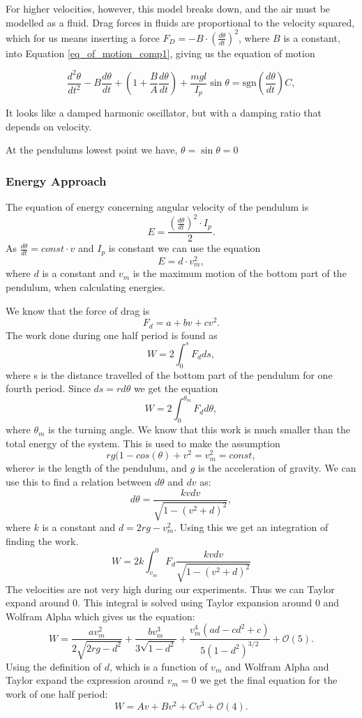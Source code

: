 \documentclass[11pt, a4paper]{article}
\begin{document}
For higher velocities, however, this model breaks down, and the air must be
modelled as a fluid. Drag forces in fluids are proportional to the velocity
squared\cite{drag}, which for us means inserting a force 
$F_D = -B\cdot \left(\frac{d\theta}{dt}\right)^2$, where $B$ is a constant,
into Equation \ref{eq_of_motion_comp1}, giving us the equation of motion

\begin{equation}
    \frac{d^2\theta}{dt^2} 
  - B \frac{d\theta}{dt}
  + \left(1 + \frac{B}{A} \frac{d\theta}{dt} \right)  
  + \frac{mgl}{I_p}\sin{\theta} = \text{sgn}(\frac{d\theta}{dt})C,
  \label{eq_of_motion_comp2}
\end{equation}

It looks like a damped harmonic oscillator, but with a
damping ratio that depends on velocity. 

At the pendulums lowest point we have, $\theta = \sin{\theta} = 0$


\subsubsection{Energy Approach}
The equation of energy concerning angular velocity of the pendulum is
\[
	E = \frac{(\frac{d\theta}{dt})^2\cdot I_p }{2}.
\]
As $\frac{d\theta}{dt} = const\cdot v$ and $I_p$ is constant we can use the equation
\[
	E = d\cdot v_m^2,
\]
where $d$ is a constant and $v_m$ is the maximum motion of the bottom part of the pendulum, when calculating energies.

We know that the force of drag is
\[
	F_d = a + bv + cv^2.
\]
The work done during one half period is found as
\[
	W = 2\int_0^s{F_d ds},
\]
where s is the distance travelled of the bottom part of the pendulum for one fourth period.
Since $ds = rd\theta$ we get the equation
\[
	W = 2\int_0^{\theta_m}{F_d d\theta},
\]
where $\theta_m$ is the turning angle.
We know that this work is much smaller than the total energy of the system. This is used to make the assumption 
\[
	rg(1-cos(\theta) + v^2 = v_m^2 = const,
\]
where$ r$ is the length of the pendulum, and $g$ is the acceleration of gravity.
We can use this to find a relation between $d\theta$ and $dv$ as:
\[
	d\theta = \frac{kvdv}{\sqrt{1-(v^2+d)^2}},
\]
where $k$ is a constant and $d = 2rg - v_{m}^{2}$.
Using this we get an integration of finding the work.
\[
	W = 2k\int_{v_m}^0 F_d \frac{kvdv}{\sqrt{1-(v^2+d)^2}}
\]
The velocities are not very high during our experiments. Thus we can Taylor expand around 0.
This integral is solved using Taylor expansion around 0 and Wolfram Alpha which gives us the equation:
\[
	W = \frac{av_{m}^{2}}{2\sqrt{2rg-d^2}} + \frac{bv_{m}^{3}}{3\sqrt{1-d^2}} + \frac{v_{m}^{4} (ad-cd^2+c)}{5(1-d^2)^{3/2}} + \mathcal{O}(5).
\]
Using the definition of $d$, which is a function of $v_m$ and Wolfram Alpha and Taylor expand the expression around $v_m=0$ we get the final equation for the work of one half period:
\[
	W = Av + Bv^2 + Cv^3 +  \mathcal{O}(4).
\]
\end{document}
